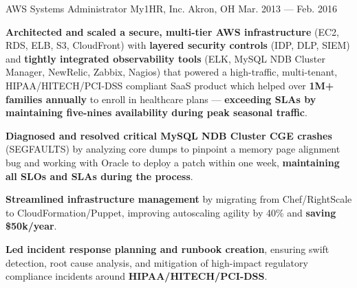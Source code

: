 \begin{cventries}
    \cventry
        { AWS Systems Administrator }
        { My1HR, Inc. }
        { Akron, OH }
        { Mar. 2013 --- Feb. 2016 }
        {
            \begin{cvitems}
                \item{\textbf{Architected and scaled a secure, multi-tier AWS infrastructure} (EC2, RDS, ELB, S3, CloudFront) with \textbf{layered security controls} (IDP, DLP, SIEM) and \textbf{tightly integrated observability tools} (ELK, MySQL NDB Cluster Manager, NewRelic, Zabbix, Nagios) that powered a high-traffic, multi-tenant, HIPAA/HITECH/PCI-DSS compliant SaaS product which helped over \textbf{1M+ families annually} to enroll in healthcare plans --- \textbf{exceeding SLAs by maintaining five-nines availability during peak seasonal traffic}.}
                \item{\textbf{Diagnosed and resolved critical MySQL NDB Cluster CGE crashes} (SEGFAULTS) by analyzing core dumps to pinpoint a memory page alignment bug and working with Oracle to deploy a patch within one week, \textbf{maintaining all SLOs and SLAs during the process}.}
                \item{\textbf{Streamlined infrastructure management} by migrating from Chef/RightScale to CloudFormation/Puppet, improving autoscaling agility by 40\% and \textbf{saving \$50k/year}.}
                \item{\textbf{Led incident response planning and runbook creation}, ensuring swift detection, root cause analysis, and mitigation of high-impact regulatory compliance incidents around \textbf{HIPAA/HITECH/PCI-DSS}.}
            \end{cvitems}
        }
\end{cventries}

